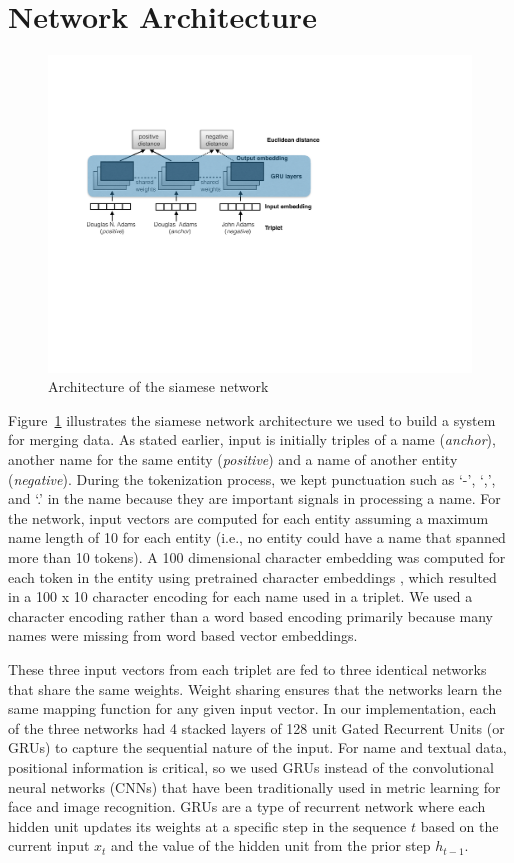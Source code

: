 \section{Network Architecture}
\label{architecture}
\begin{figure}
\includegraphics[width=1.0\linewidth]{triplet_siamese_network}
\caption{Architecture of the siamese network}
\label{siamese_nets}
\end{figure}

Figure~\ref{siamese_nets} illustrates the siamese network architecture \cite{DBLP:conf/cvpr/SchroffKP15} we used to build a system for merging data.  As stated earlier, input is initially triples of a name (\textit{anchor}), another name for the same entity (\textit{positive}) and a name of another entity (\textit{negative}).  During the tokenization process, we kept punctuation such as `-', `,', and `.' in the name because they are important signals in processing a name.  For the network, input vectors are computed for each entity assuming a maximum name length of 10 for each entity (i.e., no entity could have a name that spanned more than 10 tokens).  A 100 dimensional character embedding was computed for each token in the entity using pretrained character embeddings \cite{hashimoto-jmt:2017:EMNLP2017}, which resulted in a 100 x 10 character encoding for each name used in a triplet.  We used a character encoding rather than a word based encoding primarily because many names were missing from word based vector embeddings.

These three input vectors from each triplet are fed to three identical networks that share the same weights.  Weight sharing ensures that the networks learn the same mapping function for any given input vector.  In our implementation, each of the three networks had 4 stacked layers of 128 unit Gated Recurrent Units (or GRUs) to capture the sequential nature of the input.  For name and textual data, positional information is critical, so we used GRUs instead of the convolutional neural networks (CNNs) that have been traditionally used in metric learning for face and image recognition. GRUs are a type of recurrent network \cite{cho-al-emnlp14} where each hidden unit updates its weights at a specific step in the sequence $t$ based on the current input $x_t$ and the value of the hidden unit from the prior step $h_{t-1}$.  

